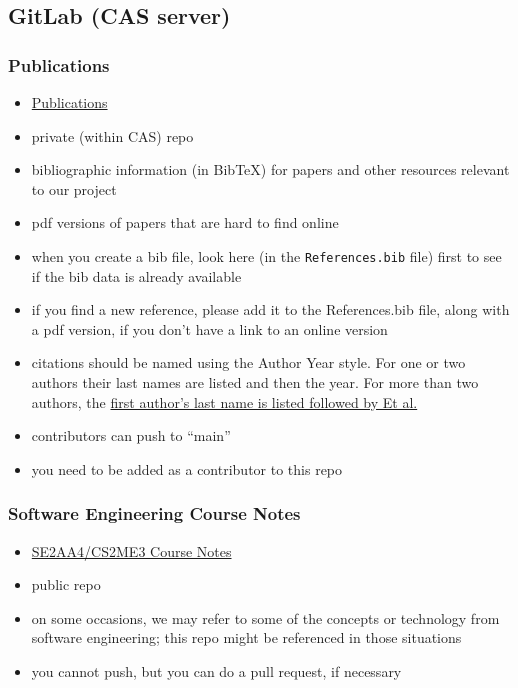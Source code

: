 \documentclass[12pt]{article}
\begin{document}
\subsection{GitLab (CAS server)}

\subsubsection{Publications}
\begin{itemize}
\item \href{https://gitlab.cas.mcmaster.ca/smiths/pub} {Publications}
\item private (within CAS) repo
\item bibliographic information (in BibTeX) for papers and other resources
relevant to our project
\item pdf versions of papers that are hard to find online
\item when you create a bib file, look here (in the \texttt{References.bib}
file) first to see if the bib data is already available
\item if you find a new reference, please add it to the References.bib file,
along with a pdf version, if you don't have a link to an online version
\item citations should be named using the Author Year style.  For one or two
authors their last names are listed and then the year.  For more than two
authors, the
\href{https://www.mcgill.ca/library/files/library/cse-name-year-citation-style-guide.pdf}
{first author's last name is listed followed by Et al.}
\item contributors can push to ``main''
\item you need to be added as a contributor to this repo
\end{itemize}

\subsubsection{Software Engineering Course Notes}
\begin{itemize}
\item \href{https://gitlab.cas.mcmaster.ca/smiths/se2aa4_cs2me3} {SE2AA4/CS2ME3 Course Notes}
\item public repo
\item on some occasions, we may refer to some of the concepts or technology from
software engineering; this repo might be referenced in those situations
\item you cannot push, but you can do a pull request, if necessary
\end{itemize}
\end{document}
